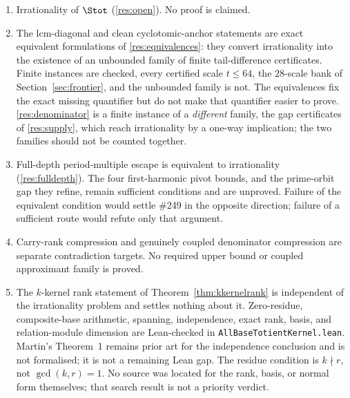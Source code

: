 \begin{enumerate}
\item Irrationality of $\Stot$ (\ref{res:open}).  No proof is claimed.
\item The lcm-diagonal and clean cyclotomic-anchor statements are exact
  equivalent formulations of \ref{res:equivalences}: they convert
  irrationality into the existence of an unbounded family of finite
  tail-difference certificates.  Finite instances are checked, every
  certified scale $t\le64$, the $28$-scale bank of
  Section~\ref{sec:frontier}, and the unbounded family is not.  The
  equivalences fix the exact missing quantifier but do not make that
  quantifier easier to prove.  \ref{res:denominator} is a finite instance of a
  \emph{different} family, the gap certificates of \ref{res:supply}, which
  reach irrationality by a one-way implication; the two families should not be
  counted together.
\item Full-depth period-multiple escape is equivalent to irrationality
  (\ref{res:fulldepth}).  The four first-harmonic pivot bounds, and the
  prime-orbit gap they refine, remain sufficient conditions and are unproved.
  Failure of the equivalent condition would settle \#249 in the opposite
  direction; failure of a sufficient route would refute only that argument.
\item Carry-rank compression and genuinely coupled denominator compression
  are separate contradiction targets.  No required upper bound or coupled
  approximant family is proved.
\item The $k$-kernel rank statement of Theorem~\ref{thm:kkernelrank} is
  independent of the irrationality problem and settles nothing about it.
  Zero-residue, composite-base arithmetic, spanning, independence, exact
  rank, basis, and relation-module dimension are Lean-checked in
  \texttt{AllBaseTotientKernel.lean}.  Martin's Theorem~1 remains prior art
  for the independence conclusion and is not formalised; it is not a remaining
  Lean gap.  The residue condition is $k\nmid r$, not $\gcd(k,r)=1$.  No source
  was located for the rank, basis, or normal form themselves; that search
  result is not a priority verdict.
\end{enumerate}

